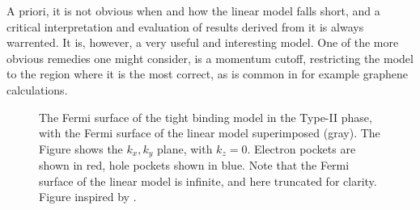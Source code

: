 A priori, it is not obvious when and how the linear model falls short, and a critical interpretation and evaluation of results derived from it is always warrented.
It is, however, a very useful and interesting model.
One of the more obvious remedies one might consider, is a momentum cutoff, restricting the model to the region where it is the most correct, as is common in for example graphene calculations.

\begin{figure}[htb]
  \centering
  \caption{The Fermi surface of the tight binding model in the Type-II phase, with the Fermi surface of the linear model superimposed (gray).
    The Figure shows the \( k_x, k_y \) plane, with \( k_z = 0 \).
    Electron pockets are shown in red, hole pockets shown in blue.
    Note that the Fermi surface of the linear model is infinite, and here truncated for clarity.
  Figure inspired by \textcite{mccormickMinimalModelsTopological2017}.}
  \label{fig:fermiSurfaceTight}
\end{figure}

